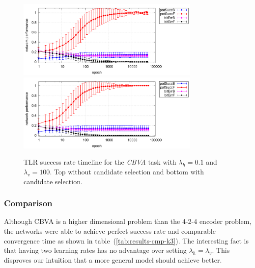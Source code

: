 \begin{figure}[H]
  \centering
  \includegraphics[width=0.8\textwidth]{img/tlr-k3-3-best-perf.pdf}   
  \includegraphics[width=0.8\textwidth]{img/tlr-k3-3-best-can.pdf}      
  \caption{TLR success rate timeline for the \emph{CBVA} task with $\lambda_h=0.1$ and $\lambda_v=100$. Top without candidate selection and bottom with candidate selection. }
  \label{fig:results-tlr-k3-epoch} 
\end{figure}

\subsubsection{Comparison} 
\label{sec:results-cmp-k3} 
Although CBVA is a higher dimensional problem than the 4-2-4 encoder problem, the networks were able to achieve perfect success rate and comparable convergence time as shown in table~(\ref{tab:results-cmp-k3}). The interesting fact is that having two learning rates has no advantage over setting $\lambda_h = \lambda_v$. This disproves our intuition that a more general model should achieve better. 


